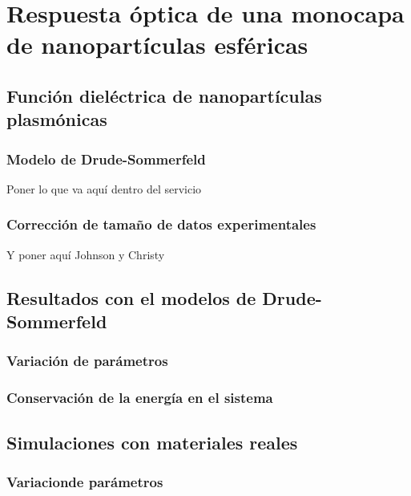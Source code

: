 \chapter{Respuesta óptica de una monocapa de nanopartículas esféricas}
\blindtext

\section{Función dieléctrica de nanopartículas plasmónicas}

	\subsection{Modelo de Drude-Sommerfeld}
Poner lo que va aquí dentro del servicio
	\subsection{Corrección de tamaño de datos experimentales}
Y poner aquí Johnson y Christy

\section{Resultados con el modelos de Drude-Sommerfeld}
	\subsection{Variación de parámetros}
	\subsection{Conservación de la energía en el sistema}
\section{Simulaciones con materiales reales}
	\subsection{Variacionde parámetros}
	
	\Blindtext

